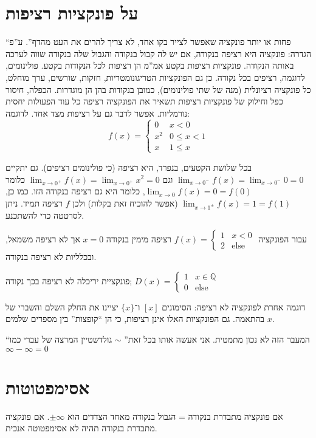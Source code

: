 \documentclass[]{article}
\newcommand\Q     {\mathbb{Q}}
\newcommand\other {\text{else}}
\newcommand\limz  {\lim_{x \to 0}}
\renewcommand\inf {\infty}
\begin{document}
	\section{על פונקציות רציפות}
	``פחות או יותר פונקציה שאפשר לצייר בקו אחד, לא צריך להרים את העט מהדף''. ע''פ הגדרה: פונקציה היא  רציפה בנקודה, אם יש לה קבול בנקודה והגבול שלה בנקודה שווה לערכה באותה הנקודה. פונקציות רציפות בקטע אמ''מ הן רציפות לכל הנקודות בקטע. פולינומים, לדוגמה, רציפים בכל נקודה. כן גם הפונקציות הטריגונומטריות, חזקות, שורשים, ערך מוחלט, כל פונקציה רציונלית (מנה של שתי פולינומים), כמובן בנקודות בהן הן מוגדרות. הכפלה, חיסור כפל וחילוק של פונקציות רציפות תשאיר את הפונקציה רציפה כל עוד הפעולות יחסית נורמליות. אפשר לדבר גם על רציפות מצד אחד. לדוגמה: 
	\[ f(x) = \begin{cases}
		0 & x < 0 \\
		x^2 & 0 \le x < 1 \\
		x & 1 \le x
	\end{cases} \]
	
	בכל שלושת הקטעים, בנפרד, היא רציפה (כי פולינומים רציפים). גם יתקיים $\lim_{x \to 0^-} f(x) = \lim_{x \to 0^-} 0 = 0 $ וגם $\lim_{x \to 0^+} f(x) = \lim_{x \to 0^+} x^2 = 0$ כלומר $\limz f(x) = 0 = f(0)$, כלומר היא גם רציפה בנקודה הזו. כמו כן, $\lim_{x \to 1^\pm} f(x) = 1 = f(1)$ (אפשר להוכיח זאת בקלות) ולכן $f$ רציפה תמיד. ניתן לסרטטה כדי להשתכנע. 
	
	עבור הפונקציה $f(x) = \begin{cases}
		1 & x< 0 \\
		2 &\other
	\end{cases}$
	רציפה מימין בנקודה $x = 0 $ אך לא רציפה משמאל, ובכלליות לא רציפה בנקודה. 
	
	פונקציית יריכלה לא רציפה בכך נקודה; $D(x) = \begin{cases}
		1 & x \in \Q \\ 0 &\other
	\end{cases}$
	
	דוגמה אחרת לפונקציה לא רציפה: 
	הסימונים $[x]$ ו־$\{x\}$ יציינו את החלק השלם והשברי של $x$ בהתאמה. גם הפונקציות האלו אינן רציפות, כי הן ``קופצות'' בין מספרים שלמים. 
	
	``המעבר הזה לא נכון מתמטית. אני אעשה אותו בכל זאת'' $\sim$ גולדשטיין המרצה של עברי כמו $\inf - \inf = 0 $
	
	\section{אסימפטוטות}
	אם פונקציה מתבדרת בנקודה = הגבול בנקודה מאחד הצדדים הוא $\pm \inf$. אם פונקציה מתבדרת בנקודה תהיה לא אסימפטוטה אנכית. 
\end{document}
